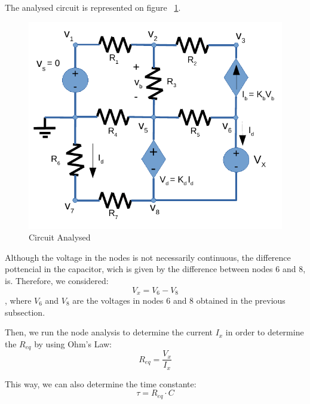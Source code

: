 The analysed circuit is represented on figure ~\ref{fig:circuit22}.

\begin{figure}[H] \centering
\includegraphics[width=0.4\linewidth]{nvoltages.pdf}
\caption{Circuit Analysed}
\label{fig:circuit22}
\end{figure}

Although the voltage in the nodes is not necessarily continuous, the difference pottencial in the capacitor, wich is given by the difference between nodes 6 and 8, is.
Therefore, we considered:
\begin{equation}
   V_{x}= V_6-V_8
\end{equation}
, where $V_6$ and $V_8$ are the voltages in nodes 6 and 8 obtained in the previous subsection.

Then, we run the node analysis to determine the current $I_x$ in order to determine the $R_{eq}$ by using Ohm's Law:
\begin{equation}
   R_{eq}= \frac{V_x}{I_x}
\end{equation}

This way, we can also determine the time constante:
\begin{equation}
   \tau = R_{eq} \cdot C
\end{equation}

